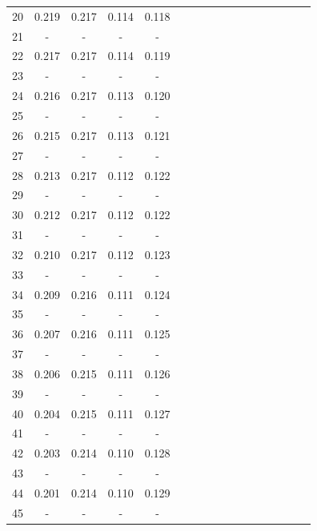 \documentclass{report}
\begin{document}
\begin{appendices}
\begin{table}
\begin{tabular}{|c|cccc|cccc|cccc|cccc|}
20 & 0.219 & 0.217 & 0.114 & 0.118 & & & & & & & & & & & &\\
21 &   -   &   -   &   -   &   -   & & & & & & & & & & & &\\
22 & 0.217 & 0.217 & 0.114 & 0.119 & & & & & & & & & & & &\\
23 &   -   &   -   &   -   &   -   & & & & & & & & & & & &\\
24 & 0.216 & 0.217 & 0.113 & 0.120 & & & & & & & & & & & &\\
25 &   -   &   -   &   -   &   -   & & & & & & & & & & & &\\
26 & 0.215 & 0.217 & 0.113 & 0.121 & & & & & & & & & & & &\\
27 &   -   &   -   &   -   &   -   & & & & & & & & & & & &\\
28 & 0.213 & 0.217 & 0.112 & 0.122 & & & & & & & & & & & &\\
29 &   -   &   -   &   -   &   -   & & & & & & & & & & & &\\
30 & 0.212 & 0.217 & 0.112 & 0.122 & & & & & & & & & & & &\\
31 &   -   &   -   &   -   &   -   & & & & & & & & & & & &\\
32 & 0.210 & 0.217 & 0.112 & 0.123 & & & & & & & & & & & &\\
33 &   -   &   -   &   -   &   -   & & & & & & & & & & & &\\
34 & 0.209 & 0.216 & 0.111 & 0.124 & & & & & & & & & & & &\\
35 &   -   &   -   &   -   &   -   & & & & & & & & & & & &\\
36 & 0.207 & 0.216 & 0.111 & 0.125 & & & & & & & & & & & &\\
37 &   -   &   -   &   -   &   -   & & & & & & & & & & & &\\
38 & 0.206 & 0.215 & 0.111 & 0.126 & & & & & & & & & & & &\\
39 &   -   &   -   &   -   &   -   & & & & & & & & & & & &\\
40 & 0.204 & 0.215 & 0.111 & 0.127 & & & & & & & & & & & &\\
41 &   -   &   -   &   -   &   -   & & & & & & & & & & & &\\
42 & 0.203 & 0.214 & 0.110 & 0.128 & & & & & & & & & & & &\\
43 &   -   &   -   &   -   &   -   & & & & & & & & & & & &\\
44 & 0.201 & 0.214 & 0.110 & 0.129 & & & & & & & & & & & &\\
45 &   -   &   -   &   -   &   -   & & & & & & & & & & & &\\

\end{tabular}
\end{table}
\end{appendices}
\end{document}
